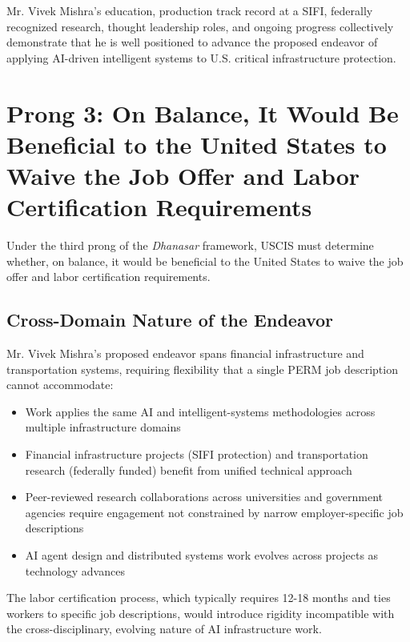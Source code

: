 \documentclass[11pt]{article}
\newcommand{\drs}{Mr. Vivek Mishra's }
\begin{document}
\drs education, production track record at a SIFI, federally recognized research, thought leadership roles, and ongoing progress collectively demonstrate that he is well positioned to advance the proposed endeavor of applying AI-driven intelligent systems to U.S. critical infrastructure protection.

\pagebreak


\section{Prong 3: On Balance, It Would Be Beneficial to the United States to Waive the Job Offer and Labor Certification Requirements}
\label{sec:prong3}

Under the third prong of the \textit{Dhanasar} framework, USCIS must determine whether, on balance, it would be beneficial to the United States to waive the job offer and labor certification requirements.

\subsection{Cross-Domain Nature of the Endeavor}

\drs proposed endeavor spans financial infrastructure and transportation systems, requiring flexibility that a single PERM job description cannot accommodate:

\begin{itemize}
    \item Work applies the same AI and intelligent-systems methodologies across multiple infrastructure domains
    \item Financial infrastructure projects (SIFI protection) and transportation research (federally funded) benefit from unified technical approach
    \item Peer-reviewed research collaborations across universities and government agencies require engagement not constrained by narrow employer-specific job descriptions
    \item AI agent design and distributed systems work evolves across projects as technology advances
\end{itemize}

The labor certification process, which typically requires 12-18 months and ties workers to specific job descriptions, would introduce rigidity incompatible with the cross-disciplinary, evolving nature of AI infrastructure work.
\end{document}
